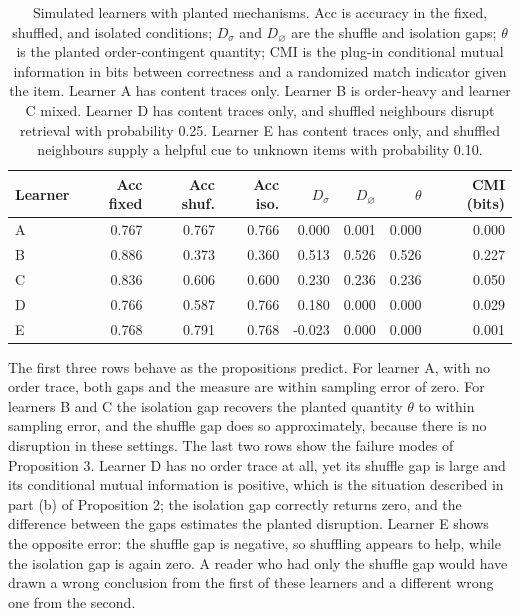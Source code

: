 \documentclass[11pt]{article}
\theoremstyle{remark}
\begin{document}
\begin{table}[ht]
\centering
\small
\begin{tabular}{lrrrrrrr}
\toprule
Learner & Acc fixed & Acc shuf. & Acc iso. & $D_\sigma$ & $D_\varnothing$ & $\theta$ & CMI (bits) \\
\midrule
A & 0.767 & 0.767 & 0.766 & 0.000 & 0.001 & 0.000 & 0.000 \\
B & 0.886 & 0.373 & 0.360 & 0.513 & 0.526 & 0.526 & 0.227 \\
C & 0.836 & 0.606 & 0.600 & 0.230 & 0.236 & 0.236 & 0.050 \\
D & 0.766 & 0.587 & 0.766 & 0.180 & 0.000 & 0.000 & 0.029 \\
E & 0.768 & 0.791 & 0.768 & -0.023 & 0.000 & 0.000 & 0.001 \\
\bottomrule
\end{tabular}
\caption{Simulated learners with planted mechanisms. Acc is accuracy in the fixed, shuffled, and isolated conditions; $D_\sigma$ and $D_\varnothing$ are the shuffle and isolation gaps; $\theta$ is the planted order-contingent quantity; CMI is the plug-in conditional mutual information in bits between correctness and a randomized match indicator given the item. Learner A has content traces only. Learner B is order-heavy and learner C mixed. Learner D has content traces only, and shuffled neighbours disrupt retrieval with probability 0.25. Learner E has content traces only, and shuffled neighbours supply a helpful cue to unknown items with probability 0.10.}
\end{table}

The first three rows behave as the propositions predict. For learner A, with no order trace, both gaps and the measure are within sampling error of zero. For learners B and C the isolation gap recovers the planted quantity $\theta$ to within sampling error, and the shuffle gap does so approximately, because there is no disruption in these settings. The last two rows show the failure modes of Proposition 3. Learner D has no order trace at all, yet its shuffle gap is large and its conditional mutual information is positive, which is the situation described in part (b) of Proposition 2; the isolation gap correctly returns zero, and the difference between the gaps estimates the planted disruption. Learner E shows the opposite error: the shuffle gap is negative, so shuffling appears to help, while the isolation gap is again zero. A reader who had only the shuffle gap would have drawn a wrong conclusion from the first of these learners and a different wrong one from the second.
\end{document}
